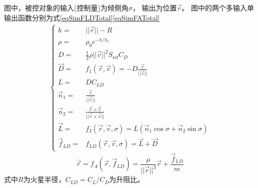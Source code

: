 图中，被控对象的输入(控制量)为倾侧角$\sigma$，
输出为位置$\vec{r}$。
图中的两个多输入单输出函数分别为式\eqref{eqSimFLDTotal}\eqref{eqSimFATotal}
\begin{align}
    \left\{\begin{aligned}
    h =& ||\vec{r}||-R \\
    \rho =& \rho_0e^{-h/h_s} \\
    D =& \frac{1}{2}\rho||\vec{v}||^2S_{\text{ref}}C_D \\
    \vec{D} =& f_1(\vec{r},\vec{v}) = -D\frac{\vec{v}}{||\vec{v}||} \\
    L =& DC_{LD} \\
    \vec{n}_1 =& \frac{\vec{r}}{||\vec{r}||} \\
    \vec{n}_2 =& \frac{\vec{r}\times\vec{v}}{||\vec{r}\times\vec{v}||} \\
    \vec{L} =& f_2(\vec{r},\vec{v},\sigma) = L(\vec{n}_1\cos\sigma + \vec{n}_2\sin\sigma) \\
    \vec{f}_{LD} =& f_{LD}(\vec{r},\vec{v},\sigma) = \vec{L} + \vec{D}
\end{aligned}\right. \label{eqSimFLDTotal}
\end{align}
\begin{equation}
    \ddot{\vec{r}} = f_A(\vec{r},\vec{f}_{LD}) = \frac{\mu}{||\vec{r}||^3}\vec{r}+\frac{\vec{f}_{LD}}{m} \label{eqSimFATotal}
\end{equation}
式中$R$为火星半径，$C_{LD}=C_L/C_D$为升阻比。

